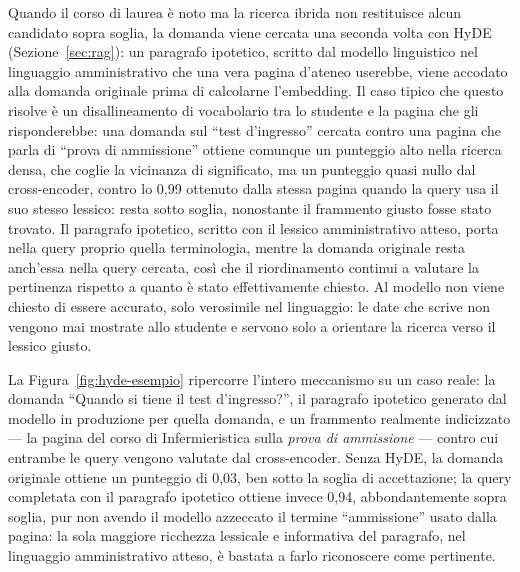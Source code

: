 Quando il corso di laurea è noto ma la ricerca ibrida non restituisce alcun candidato sopra soglia, la domanda viene
cercata una seconda volta con HyDE (Sezione~\ref{sec:rag}): un paragrafo ipotetico, scritto dal modello linguistico
nel linguaggio amministrativo che una vera pagina d'ateneo userebbe, viene accodato alla domanda originale prima di
calcolarne l'embedding. Il caso tipico che questo risolve è un disallineamento di vocabolario tra lo studente e la
pagina che gli risponderebbe: una domanda sul ``test d'ingresso'' cercata contro una pagina che parla di ``prova di
ammissione'' ottiene comunque un punteggio alto nella ricerca densa, che coglie la vicinanza di significato, ma un
punteggio quasi nullo dal cross-encoder, contro lo 0,99 ottenuto dalla stessa pagina quando la query usa il
suo stesso lessico: resta sotto soglia, nonostante
il frammento giusto fosse stato trovato. Il paragrafo ipotetico, scritto con il lessico amministrativo atteso,
porta nella query proprio quella terminologia, mentre la domanda originale resta anch'essa nella query cercata, così
che il riordinamento continui a valutare la pertinenza rispetto a quanto è stato effettivamente chiesto. Al modello
non viene chiesto di essere accurato, solo verosimile nel linguaggio: le date che scrive non vengono mai mostrate
allo studente e servono solo a orientare la ricerca verso il lessico giusto.

La Figura~\ref{fig:hyde-esempio} ripercorre l'intero meccanismo su un caso reale: la domanda ``Quando si tiene il
test d'ingresso?'', il paragrafo ipotetico generato dal modello in produzione per quella domanda, e un frammento
realmente indicizzato --- la pagina del corso di Infermieristica sulla \emph{prova di ammissione} --- contro cui
entrambe le query vengono valutate dal cross-encoder. Senza HyDE, la domanda originale ottiene un punteggio di
0,03, ben sotto la soglia di accettazione; la query completata con il paragrafo ipotetico ottiene invece 0,94,
abbondantemente sopra soglia, pur non avendo il modello azzeccato il termine ``ammissione'' usato dalla pagina: la
sola maggiore ricchezza lessicale e informativa del paragrafo, nel linguaggio amministrativo atteso, è bastata a
farlo riconoscere come pertinente.

